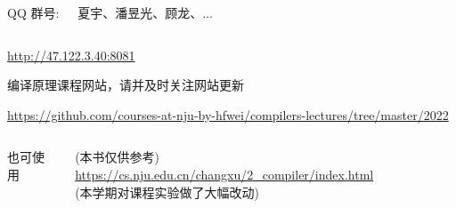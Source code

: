 \begin{frame}{}
  \begin{columns}
    \begin{center}
      QQ 群号: 

    \end{center}
    \begin{center}
      {\bf {}} 夏宇、潘昱光、顾龙、$\dots$
    \end{center}
  \end{columns}
\end{frame}

\begin{frame}{}
  \begin{center}
    \url{http://47.122.3.40:8081} \\[5pt]


    编译原理课程网站，请并及时关注网站更新
  \end{center}
\end{frame}

\begin{frame}{}
  \begin{center}

    \vspace{0.50cm}
    \url{https://github.com/courses-at-nju-by-hfwei/compilers-lectures/tree/master/2022}
  \end{center}
\end{frame}

\begin{frame}{}
  \begin{columns}
    \begin{center}
      也可使用
    \end{center}
    \begin{center}
      (本书仅供参考)
      \url{https://cs.nju.edu.cn/changxu/2_compiler/index.html} \\[3pt]
      (本学期对课程实验做了大幅改动)
    \end{center}
  \end{columns}
\end{frame}

